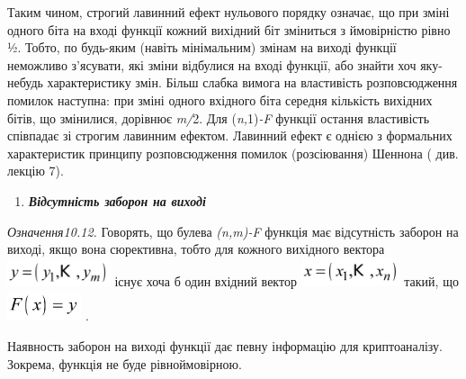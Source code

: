 Таким чином, строгий лавинний ефект нульового порядку означає, що при зміні
одного біта на вході функції кожний вихідний біт зміниться з ймовірністю рівно
½. Тобто, по будь-яким (навіть мінімальним) змінам на виході функції неможливо
з’ясувати, які зміни відбулися на вході функції, або знайти хоч яку-небудь
характеристику змін.  Більш слабка вимога на властивість розповсюдження помилок
наступна: при зміні одного вхідного біта середня кількість вихідних бітів, що
змінилися, дорівнює \textit{m}\textit{/}2. Для
(\textit{n}\textit{,}1)\textit{{}-}\textit{F}  функції остання властивість
співпадає зі строгим лавинним ефектом. Лавинний ефект є однією з формальних
характеристик принципу  розповсюдження помилок (розсіювання) Шеннона ( див.
лекцію 7). 


\bigskip

\liststyleWWviiiNumxxix
\setcounter{saveenum}{\value{enumi}}
\begin{enumerate}
\setcounter{enumi}{\value{saveenum}}
\item {\bfseries\itshape
Відсутність заборон на виході}
\end{enumerate}
\textit{ Означення10.12.} Говорять, що булева
\textit{(}\textit{n}\textit{,}\textit{m}\textit{)-}\textit{F}  функція має
відсутність заборон на виході, якщо вона сюр{\textquotesingle}ективна, тобто
для кожного вихідного вектора 
\includegraphics[width=1.1953in,height=0.3134in]{crypt-img/crypt-img235.png} 
існує хоча б один вхідний вектор 
\includegraphics[width=1.1465in,height=0.3228in]{crypt-img/crypt-img236.png} 
такий, що 
\includegraphics[width=0.8571in,height=0.3563in]{crypt-img/crypt-img237.png} .

Наявность заборон на виході функції дає певну інформацію для криптоаналізу.
Зокрема, функція не буде рівноймовірною.  


\bigskip

